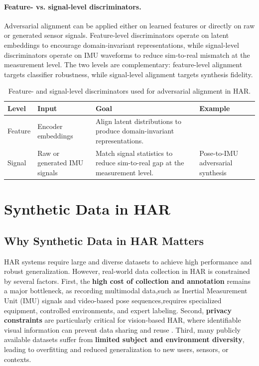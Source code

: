 \paragraph{Feature- vs. signal-level discriminators.}
Adversarial alignment can be applied either on learned features or directly on raw or generated sensor signals. Feature-level discriminators operate on latent embeddings to encourage domain-invariant representations, while signal-level discriminators operate on IMU waveforms to reduce sim-to-real mismatch at the measurement level. The two levels are complementary: feature-level alignment targets classifier robustness, while signal-level alignment targets synthesis fidelity.

\begin{table}[t]
  \centering
  \footnotesize
  \caption{Feature- and signal-level discriminators used for adversarial alignment in HAR.}
  \label{tab:discriminator-levels}
  \begin{tabular}{l l p{6.0cm} l}
    \toprule
    \textbf{Level} & \textbf{Input} & \textbf{Goal} & \textbf{Example} \\
    \midrule
    Feature & Encoder embeddings & Align latent distributions to produce domain-invariant representations. & \cite{sanabria2021contrasgan, wu2024class} \\
    Signal & Raw or generated IMU signals & Match signal statistics to reduce sim-to-real gap at the measurement level. & Pose-to-IMU adversarial synthesis \\
    \bottomrule
  \end{tabular}
\end{table}


\section{Synthetic Data in HAR}
\label{sec:syntheticdatainHAR}
\subsection{Why Synthetic Data in HAR Matters}

HAR systems require large and diverse datasets to achieve high performance and robust generalization. However, real-world data collection in HAR is constrained by several factors. First, the \textbf{high cost of collection and annotation} remains a major bottleneck, as recording multimodal data,such as Inertial Measurement Unit (IMU) signals and video-based pose sequences,requires specialized equipment, controlled environments, and expert labeling. Second, \textbf{privacy constraints} are particularly critical for vision-based HAR, where identifiable visual information can prevent data sharing and reuse \cite{kamboj2024survey}. Third, many publicly available datasets suffer from \textbf{limited subject and environment diversity}, leading to overfitting and reduced generalization to new users, sensors, or contexts.

